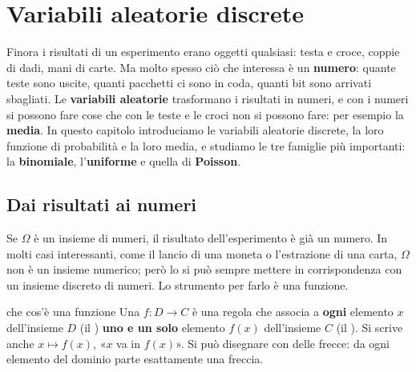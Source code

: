 \chapter{Variabili aleatorie discrete}

Finora i risultati di un esperimento erano oggetti qualsiasi: testa e croce, coppie di dadi, mani di carte. Ma molto
spesso ciò che interessa è un \textbf{numero}: quante teste sono uscite, quanti pacchetti ci sono in coda, quanti bit
sono arrivati sbagliati. Le \textbf{variabili aleatorie} trasformano i risultati in numeri, e con i numeri si possono
fare cose che con le teste e le croci non si possono fare: per esempio la \textbf{media}. In questo capitolo
introduciamo le variabili aleatorie discrete, la loro funzione di probabilità e la loro media, e studiamo le tre
famiglie più importanti: la \textbf{binomiale}, l'\textbf{uniforme} e quella di \textbf{Poisson}.

\section{Dai risultati ai numeri}

Se $\Omega$ è un insieme di numeri, il risultato dell'esperimento è già un numero. In molti casi interessanti, come il
lancio di una moneta o l'estrazione di una carta, $\Omega$ non è un insieme numerico; però lo si può sempre mettere in
corrispondenza con un insieme discreto di numeri. Lo strumento per farlo è una funzione.

\begin{richiamo}{che cos'è una funzione}
Una  $f : D \to C$ è una regola che associa a \textbf{ogni} elemento $x$ dell'insieme $D$ (il
) \textbf{uno e un solo} elemento $f(x)$ dell'insieme $C$ (il ). Si scrive anche
$x \mapsto f(x)$, «$x$ va in $f(x)$». Si può disegnare con delle frecce: da ogni elemento del dominio parte
esattamente una freccia.
\begin{center}
\end{center}
\end{richiamo}

